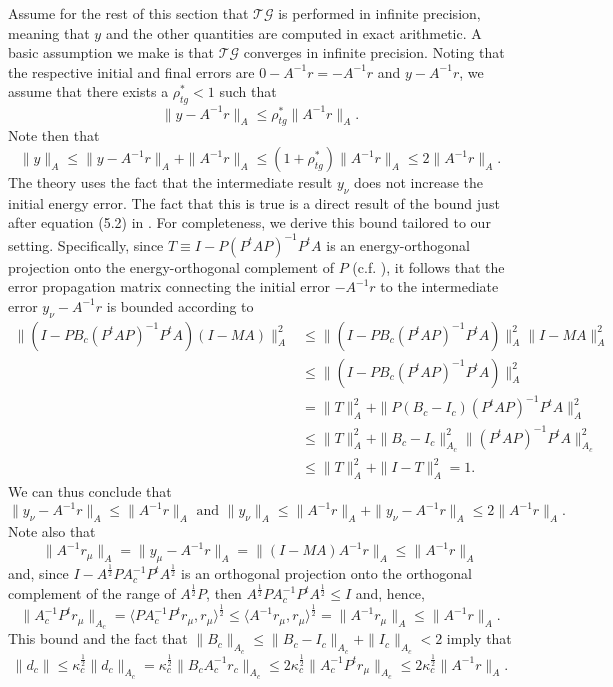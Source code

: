 \documentclass[onefignum,onetabnum]{siamart220329}
\newcommand{\tg}{$\mathcal{TG}$}
\begin{document}
{Assume for the rest of this section that {\tg } is performed in infinite precision, meaning that $y$ and the other quantities  are computed in exact arithmetic. A basic assumption we make is that {\tg } converges in infinite precision. Noting that the respective initial and final errors are $0 - A^{-1}r = - A^{-1}r$ and $y - A^{-1}r$, we assume that there exists a $\rho_{tg}^* < 1$ such that
\[
\|y - A^{-1}r\|_A \le \rho_{tg}^* \|A^{-1}r\|_A .
\]
Note then that
\begin{equation}
\|y\|_A \le \|y - A^{-1}r\|_A + \|A^{-1}r\|_A \le (1 + \rho_{tg}^*) \|A^{-1}r\|_A \le 2 \|A^{-1}r\|_A .
\label{y}
\end{equation}
The theory uses the fact that the intermediate result $y_\nu$ does not increase the initial energy error. The fact that this is true is a direct result of the bound just after equation (5.2) in \cite{McCormick2021}. For completeness, we derive this bound tailored to our setting. Specifically, since $T \equiv I - P(P^tAP)^{-1}P^tA$ is an energy-orthogonal projection onto the energy-orthogonal complement of $P$ (c.f. \cite{tutorial}), it follows that the error propagation matrix connecting the initial error $- A^{-1}r$ to the intermediate error $y_\nu - A^{-1}r$ is bounded according to
\begin{align*}
\|(I - PB_c (P^tAP)^{-1}P^tA)(I - MA)\|_A^2 
& \le \|(I - PB_c (P^tAP)^{-1}P^tA)\|_A^2  \|I - MA\|_A^2 \\
& \le \|(I - PB_c (P^tAP)^{-1}P^tA)\|_A^2 \\
& = \|T\|_A^2 + \|P(B_c - I_c) (P^tAP)^{-1}P^tA\|_A^2  \\
& \le \|T\|_A^2 + \|B_c - I_c\|_{A_c}^2  \|(P^tAP)^{-1}P^tA\|_{A_c}^2  \\
& \le \|T\|_A^2 + \|I - T\|_A^2 = 1.
\end{align*}
We can thus conclude that
\begin{equation}
\|y_\nu - A^{-1}r\|_A \le \|A^{-1}r\|_A \textrm{   and   }\|y_\nu\|_A \le \|A^{-1}r\|_A + \|y_\nu - A^{-1}r\|_A \le 2 \|A^{-1}r\|_A .
\label{ynu}
\end{equation}
Note also that
\[
\|A^{-1}r_\mu\|_A = \|y_\mu - A^{-1}r\|_A = \|(I - MA) A^{-1}r\|_A \le \|A^{-1}r\|_A 
\]
and, since $I - A^\frac{1}{2}PA_c^{-1}P^tA^\frac{1}{2}$ is an orthogonal projection onto the orthogonal complement of the range of $A^\frac{1}{2}P$, then $A^\frac{1}{2}PA_c^{-1}P^tA^\frac{1}{2} \le I$ and, hence,
\[
\|A_c^{-1}P^tr_\mu\|_{A_c} = \langle PA_c^{-1}P^tr_\mu, r_\mu\rangle^\frac{1}{2} \le \langle A^{-1}r_\mu, r_\mu\rangle^\frac{1}{2} = \|A^{-1}r_\mu\|_A \le \|A^{-1}r\|_A .
\]
This bound and the fact that $\|B_c\|_{A_c} \le \|B_c - I_c\|_{A_c} + \|I_c\|_{A_c} < 2$ imply that
\begin{equation}
\|d_c\| \le \kappa_c^\frac{1}{2} 
\|d_c\|_{A_c} = \kappa_c^\frac{1}{2} \|B_cA_c^{-1}r_c\|_{A_c} \le 2\kappa_c^\frac{1}{2} \|A_c^{-1}P^tr_\mu\|_{A_c}
\le 2 \kappa_c^\frac{1}{2} \|A^{-1}r\|_A .
\label{dc}
\end{equation}

}
\end{document}
